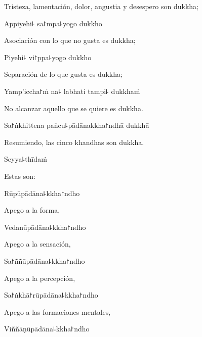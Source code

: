 \begin{english}
  Tristeza, lamentación, dolor, angustia y desespero son dukkha;
\end{english}

Appiyehi꜕ sa꜓mpa꜕yogo dukkho

\begin{english}
  Asociación con lo que no gusta es dukkha;
\end{english}

Piyehi꜕ vi꜓ppa꜕yogo dukkho

\begin{english}
  Separación de lo que gusta es dukkha;
\end{english}

Yamp'iccha꜓ṁ na꜕ labhati tampi꜕ dukkhaṁ

\begin{english}
  No alcanzar aquello que se quiere es dukkha.
\end{english}

Sa꜓ṅkhittena pañcu꜕pādānakkha꜓ndhā dukkhā

\begin{english}
  Resumiendo, las cinco khandhas son dukkha.
\end{english}

Seyya꜕thīdaṁ

\begin{english}
  Estas son:
\end{english}

\clearpage

Rūpūpādāna꜕kkha꜓ndho

\begin{english}
  Apego a la forma,
\end{english}

Vedanūpādāna꜕kkha꜓ndho

\begin{english}
  Apego a la sensación,
\end{english}

Sa꜓ññūpādāna꜕kkha꜓ndho

\begin{english}
  Apego a la percepción,
\end{english}

Sa꜓ṅkhā꜓rūpādāna꜕kkha꜓ndho

\begin{english}
  Apego a las formaciones mentales,
\end{english}

Viññāṇūpādāna꜕kkha꜓ndho

